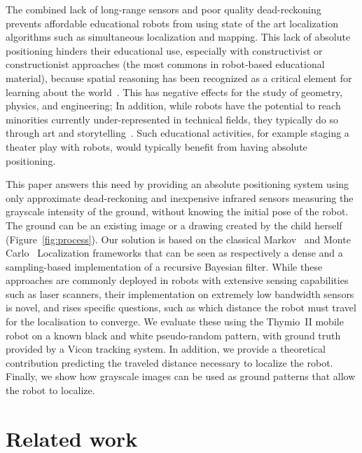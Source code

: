 \documentclass[letterpaper, 10pt, conference]{ieeeconf}
\newcommand{\fig}[1]{Figure~\ref{fig:#1}}
\begin{document}
The combined lack of long-range sensors and poor quality dead-reckoning prevents affordable educational robots from using state of the art localization algorithms such as simultaneous localization and mapping.
This lack of absolute positioning hinders their educational use, especially with constructivist or constructionist approaches (the most commons in robot-based educational material), because spatial reasoning has been recognized as a critical element for learning about the world~\cite{lesh2003beyond}.
This has negative effects for the study of geometry, physics, and engineering;
In addition, while robots have the potential to reach minorities currently under-represented in technical fields, they typically do so through art and storytelling~\cite{szecsei2015girls}.
Such educational activities, for example staging a theater play with robots, would typically benefit from having absolute positioning.

This paper answers this need by providing an absolute positioning system using only approximate dead-reckoning and inexpensive infrared sensors measuring the grayscale intensity of the ground, without knowing the initial pose of the robot.
The ground can be an existing image or a drawing created by the child herself (\fig{process}).
Our solution is based on the classical Markov~\cite{fox1999markov} and Monte Carlo~\cite{dellaert1999monte} Localization frameworks that can be seen as respectively a dense and a sampling-based implementation of a recursive Bayesian filter.
While these approaches are commonly deployed in robots with extensive sensing capabilities such as laser scanners, their implementation on extremely low bandwidth sensors is novel, and rises specific questions, such as which distance the robot must travel for the localisation to converge.
We evaluate these using the Thymio~II mobile robot on a known black and white pseudo-random pattern, with ground truth provided by a Vicon tracking system.
In addition, we provide a theoretical contribution predicting the traveled distance necessary to localize the robot.
Finally, we show how grayscale images can be used as ground patterns that allow the robot to localize.

\section{Related work}
\end{document}
